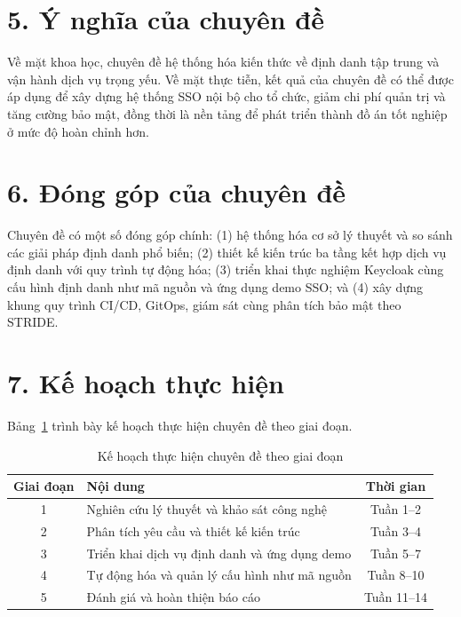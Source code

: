 \section*{5. Ý nghĩa của chuyên đề}

Về mặt khoa học, chuyên đề hệ thống hóa kiến thức về định danh tập trung và
vận hành dịch vụ trọng yếu. Về mặt thực tiễn, kết quả của chuyên đề có thể
được áp dụng để xây dựng hệ thống SSO nội bộ cho tổ chức, giảm chi phí quản
trị và tăng cường bảo mật, đồng thời là nền tảng để phát triển thành đồ án tốt
nghiệp ở mức độ hoàn chỉnh hơn.

\section*{6. Đóng góp của chuyên đề}

Chuyên đề có một số đóng góp chính: (1) hệ thống hóa cơ sở lý thuyết và so sánh
các giải pháp định danh phổ biến; (2) thiết kế kiến trúc ba tầng kết hợp dịch vụ
định danh với quy trình tự động hóa; (3) triển khai thực nghiệm Keycloak cùng
cấu hình định danh như mã nguồn và ứng dụng demo SSO; và (4) xây dựng khung
quy trình CI/CD, GitOps, giám sát cùng phân tích bảo mật theo STRIDE.

\section*{7. Kế hoạch thực hiện}

Bảng~\ref{tab:kehoach} trình bày kế hoạch thực hiện chuyên đề theo giai đoạn.

\begin{table}[H]
\centering
\caption{Kế hoạch thực hiện chuyên đề theo giai đoạn}
\label{tab:kehoach}
\small
\begin{tabular}{c p{8cm} c}
\toprule
\textbf{Giai đoạn} & \textbf{Nội dung} & \textbf{Thời gian}\\
\midrule
1 & Nghiên cứu lý thuyết và khảo sát công nghệ & Tuần 1--2\\
2 & Phân tích yêu cầu và thiết kế kiến trúc & Tuần 3--4\\
3 & Triển khai dịch vụ định danh và ứng dụng demo & Tuần 5--7\\
4 & Tự động hóa và quản lý cấu hình như mã nguồn & Tuần 8--10\\
5 & Đánh giá và hoàn thiện báo cáo & Tuần 11--14\\
\bottomrule
\end{tabular}
\end{table}

